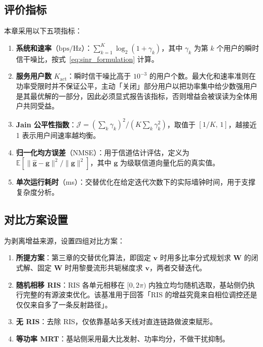 \subsection{评价指标}

本章采用以下五项指标：

\begin{enumerate}
  \item \textbf{系统和速率}（$\mathrm{bps/Hz}$）：$\sum_{k=1}^{K}\log_{2}(1+\gamma_{k})$，其中 $\gamma_{k}$ 为第 $k$ 个用户的瞬时信干噪比，按式~\eqref{eq:sinr_formulation} 计算。
  \item \textbf{服务用户数} $K_{\mathrm{act}}$：瞬时信干噪比高于 $10^{-3}$ 的用户个数。最大化和速率准则在功率受限时并不保证公平，主动「关闭」部分用户以把功率集中给少数强用户是其最优解的一部分，因此必须显式报告该指标，否则增益会被误读为全体用户共同受益。
  \item \textbf{Jain 公平性指数}：$\mathcal{J} = \left(\sum_{k}\gamma_{k}\right)^{2}\big/\left(K\sum_{k}\gamma_{k}^{2}\right)$，取值于 $[1/K,\,1]$，越接近 1 表示用户间速率越均衡。
  \item \textbf{归一化均方误差}（NMSE）：用于信道估计评估，定义为 $\mathbb{E}\left[\|\hat{\bm{g}}-\bm{g}\|^{2}/\|\bm{g}\|^{2}\right]$，其中 $\bm{g}$ 为级联信道向量化后的真实值。
  \item \textbf{单次运行耗时}（ms）：交替优化在给定迭代次数下的实际墙钟时间，用于支撑复杂度分析。
\end{enumerate}

\subsection{对比方案设置}

为剥离增益来源，设置四组对比方案：

\begin{enumerate}
  \item \textbf{所提方案}：第三章的交替优化算法，即固定 $\bm{v}$ 时用多比率分式规划求 $\bm{W}$ 的闭式解、固定 $\bm{W}$ 时用黎曼流形共轭梯度求 $\bm{v}$，两者交替迭代。
  \item \textbf{随机相移 RIS}：RIS 各单元相移在 $[0,2\pi)$ 内独立均匀随机选取，基站侧仍执行完整的有源波束优化。该基准用于回答「RIS 的增益究竟来自相位调控还是仅仅来自多了一条反射路径」。
  \item \textbf{无 RIS}：去除 RIS，仅依靠基站多天线对直连链路做波束赋形。
  \item \textbf{等功率 MRT}：基站侧采用最大比发射、功率均分，不做干扰抑制。
\end{enumerate}

